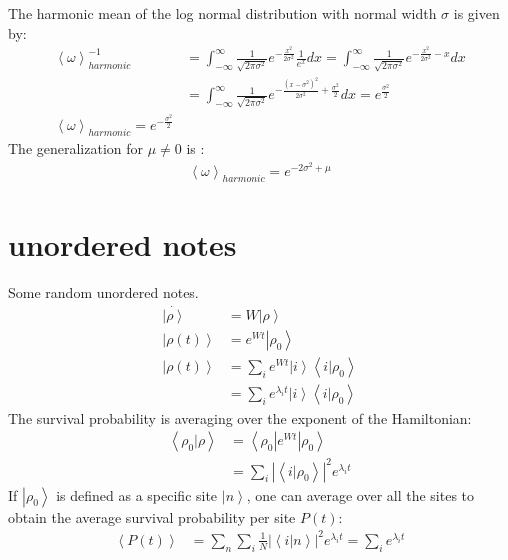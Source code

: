 \documentclass[onecolumn,fleqn]{revtex4}
\newcommand{\abs}[1]{\left|#1\right|}
\newcommand{\aket}[1]{\left| #1 \right\rangle}
\newcommand{\abra}[1]{\left\langle #1 \right|}
\newcommand{\abraket}[2]{\left\langle #1 | #2   \right\rangle}
\newcommand{\avg}[1]{\left\langle #1 \right\rangle}
\begin{document}
The harmonic mean of the log normal distribution with normal width $\sigma$ is given by:
\begin{align}
\avg{\omega}_{harmonic}^{-1} &= \int_{-\infty}^\infty \frac{1}{\sqrt{2\pi\sigma^2}}e^{-\frac{x^2}{2\sigma^2}} \frac{1}{e^x} dx  = \int_{-\infty}^\infty \frac{1}{\sqrt{2\pi\sigma^2}}e^{-\frac{x^2}{2\sigma^2}-x} dx \\
&= \int_{-\infty}^\infty \frac{1}{\sqrt{2\pi\sigma^2}}e^{-\frac{\left(x-\sigma^2\right)^2}{2\sigma^2}+\frac{\sigma^2}{2}} dx = e^{\frac{\sigma^2}{2}}\\
\avg{\omega}_{harmonic} = e^{-\frac{\sigma^2}{2}}
\end{align}
The generalization for $\mu\neq 0$ is :
\begin{align}
\avg{\omega}_{harmonic} = e^{-2\sigma^2+\mu}
\end{align}



\section{unordered notes}
Some random unordered notes.
\begin{align}
\dot{\aket{\rho}}&=W\aket{\rho} \\
\aket{\rho(t)} &= e^{Wt}\aket{\rho_0} \\
\aket{\rho(t)} &= \sum_i e^{Wt}\aket{i}\abraket{i}{\rho_0} \\
&= \sum_i e^{\lambda_i t}\aket{i}\abraket{i}{\rho_0}
\end{align}
The survival probability is averaging over the exponent of the Hamiltonian:
\begin{align}
\abraket{\rho_0}{\rho} &= \abra{\rho_0}e^{Wt}\aket{\rho_0} \\
&= \sum_i \abs{\abraket{i}{\rho_0}}^2e^{\lambda_it}
\end{align}
If $\aket{\rho_0}$ is defined as a specific site $\aket{n}$, one can average over all the sites to obtain the average survival probability per site $P(t)$: 
\begin{align}
\avg{ P(t) } &= \sum_n\sum_i \frac{1}{N}\abs{\abraket{i}{n}}^2e^{\lambda_it}= \sum_i e^{\lambda_i t}
\end{align}
\end{document}
